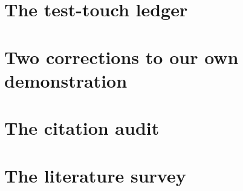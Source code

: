 \documentclass[11pt]{article}
\begin{document}


\appendix
\section{The test-touch ledger}\label{app:ledger}


\section{Two corrections to our own demonstration}\label{app:corrections}


\section{The citation audit}\label{app:citations}


\section{The literature survey}\label{app:survey}

\end{document}
